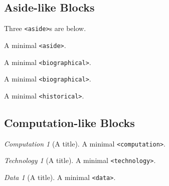 \documentclass{amsart}
\theoremstyle{plain}%
\theoremstyle{definition}%
\theoremstyle{remark}%
\newtheorem{computation}[theorem]{Computation}
\newtheorem{technology}[theorem]{Technology}
\newtheorem{data}[theorem]{Data}
\newcommand{\mono}[1]{\texttt{#1}}
\numberwithin{equation}{section}
\begin{document}
\subsection{Aside-like Blocks}\label{block-samples-aside-like}%
Three \mono{<aside>}s are below.%
\begin{aside}[A title.]\label{block-samples-aside-like-3}%
%
A minimal \mono{<aside>}.%
\end{aside}
\begin{biographical}[A title.]\label{block-samples-aside-like-4}%
%
A minimal \mono{<biographical>}.%
\end{biographical}
\begin{biographical}[A title.]\label{block-samples-aside-like-5}%
%
A minimal \mono{<biographical>}.%
\end{biographical}
\begin{historical}[A title.]\label{block-samples-aside-like-6}%
%
A minimal \mono{<historical>}.%
\end{historical}
%
%
\typeout{************************************************}
\typeout{************************************************}
%
\subsection{Computation-like Blocks}\label{block-samples-computation-like}%
\begin{computation}[A title]\label{block-samples-computation-like-2}%
%
A minimal \mono{<computation>}.%
\end{computation}
\begin{technology}[A title]\label{block-samples-computation-like-3}%
%
A minimal \mono{<technology>}.%
\end{technology}
\begin{data}[A title]\label{block-samples-computation-like-4}%
%
A minimal \mono{<data>}.%
\end{data}
%
%
\typeout{************************************************}
\typeout{************************************************}
%
\end{document}
